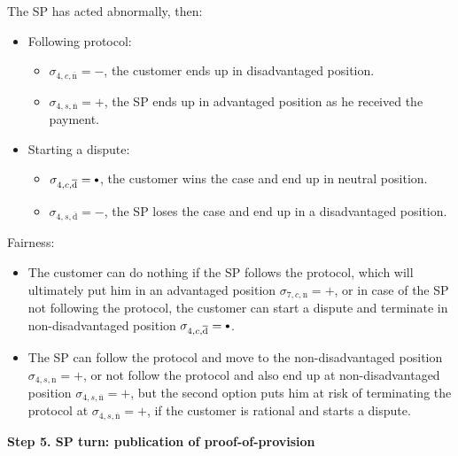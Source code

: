 \documentclass{ieeeaccess}
\newcommand\sbullet[1][.75]{\mathbin{\ThisStyle{\vcenter{\hbox{%
  \scalebox{#1}{$\SavedStyle\bullet$}}}}}%
}
\begin{document}
The SP has acted abnormally, then:

\begin{itemize}
\item
  Following protocol:

  \begin{itemize}
  
  \item
    \(\sigma_{4, c, \overline{\mathrm{n}}} = -\), the customer ends up in
    disadvantaged position.
  \item
    \(\sigma_{4, s, \overline{\mathrm{n}}} = +\), the SP ends up in
    advantaged position as he received the payment.
  \end{itemize}
\item
  Starting a dispute:

  \begin{itemize}
  
  \item
    \(\sigma_{4, c, \overline{\mathrm{d}}} = \sbullet\), the customer wins the
    case and end up in neutral position.
  \item
    \(\sigma_{4, s, \overline{\mathrm{d}}} = -\), the SP loses the case
    and end up in a disadvantaged position.
  \end{itemize}
\end{itemize}

Fairness:

\begin{itemize}

\item
  The customer can do nothing if the SP follows the protocol, which will
  ultimately put him in an advantaged position
  \(\sigma_{7, c, \mathrm{n}} = +\), or in case of the SP not following
  the protocol, the customer can start a dispute and terminate in
  non-disadvantaged position
  \(\sigma_{4, c, \overline{\mathrm{d}}} = \sbullet\).
\item
  The SP can follow the protocol and move to the non-disadvantaged
  position \(\sigma_{4, s, \mathrm{n}} = +\), or not follow the protocol
  and also end up at non-disadvantaged position
  \(\sigma_{4, s, \overline{\mathrm{n}}} = +\), but the second option
  puts him at risk of terminating the protocol at
  \(\sigma_{4, s, \overline{\mathrm{n}}} = +\), if the customer is
  rational and starts a dispute.
\end{itemize}

\noindent \textbf
{Step 5. SP turn: publication of proof-of-provision}\label{step-5-publication-of-proof-of-provision}
\end{document}
